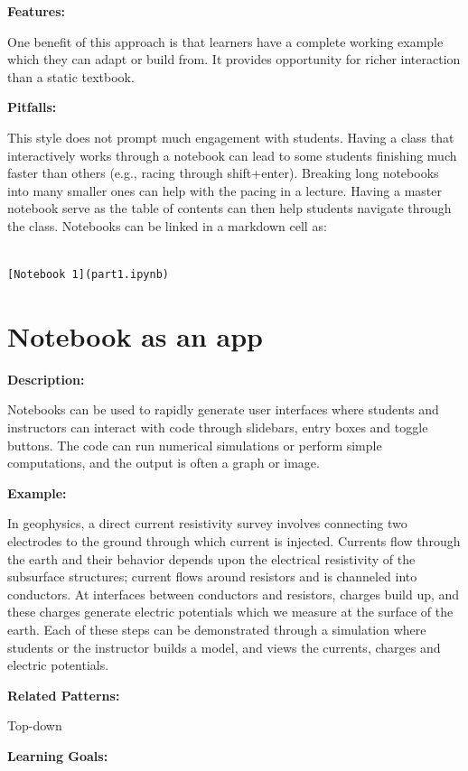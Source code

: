 \documentclass[]{book}
\begin{document}
\textbf{Features:}

One benefit of this approach is that learners have a complete working
example which they can adapt or build from. It provides opportunity for
richer interaction than a static textbook.

\textbf{Pitfalls:}

This style does not prompt much engagement with students. Having a class
that interactively works through a notebook can lead to some students
finishing much faster than others (e.g., racing through shift+enter).
Breaking long notebooks into many smaller ones can help with the pacing
in a lecture. Having a master notebook serve as the table of contents
can then help students navigate through the class. Notebooks can be
linked in a markdown cell as:

\begin{verbatim}

[Notebook 1](part1.ipynb)
\end{verbatim}

\section{Notebook as an app}\label{notebook-as-an-app}

\textbf{Description:}

Notebooks can be used to rapidly generate user interfaces where students
and instructors can interact with code through slidebars, entry boxes
and toggle buttons. The code can run numerical simulations or perform
simple computations, and the output is often a graph or image.

\textbf{Example:}

In geophysics, a direct current resistivity survey involves connecting
two electrodes to the ground through which current is injected. Currents
flow through the earth and their behavior depends upon the electrical
resistivity of the subsurface structures; current flows around resistors
and is channeled into conductors. At interfaces between conductors and
resistors, charges build up, and these charges generate electric
potentials which we measure at the surface of the earth. Each of these
steps can be demonstrated through a simulation where students or the
instructor builds a model, and views the currents, charges and electric
potentials.

\textbf{Related Patterns:}

Top-down

\textbf{Learning Goals:}
\end{document}

